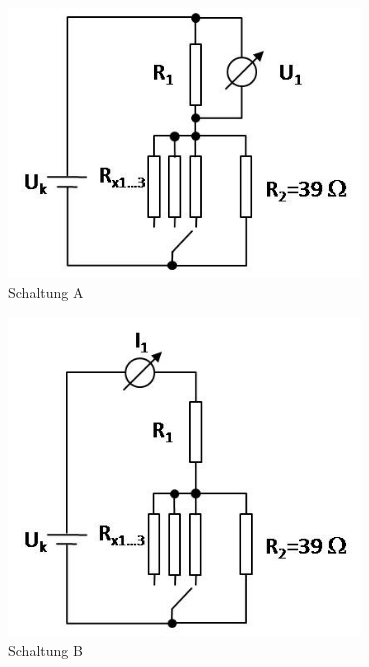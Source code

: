 \begin{minipage}[b]{0.5\textwidth}
 \centering
 \includegraphics[width=0.7\textwidth]{Abbildungen/SchaltungA.jpg}\\
 Schaltung A
\end{minipage}
%
\begin{minipage}[b]{0.5\textwidth}
 \centering
 \includegraphics[width=0.7\textwidth]{Abbildungen/SchaltungB.jpg}\\
 Schaltung B
\end{minipage}

